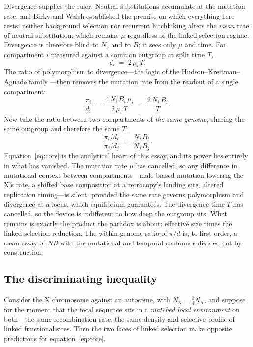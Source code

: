 \documentclass[11pt,a4paper]{article}
\newcommand{\Ne}{N_{e}}
\newcommand{\NA}{N_{\mathrm{A}}}
\newcommand{\NX}{N_{\mathrm{X}}}
\begin{document}
Divergence supplies the ruler. Neutral substitutions accumulate at the mutation rate, and Birky and Walsh \citep{birkywalsh1988} established the premise on which everything here rests: neither background selection nor recurrent hitchhiking alters the \emph{mean} rate of neutral substitution, which remains $\mu$ regardless of the linked-selection regime. Divergence is therefore blind to $\Ne$ and to $B$; it sees only $\mu$ and time. For compartment $i$ measured against a common outgroup at split time $T$,
\begin{equation}
    d_i \;=\; 2\,\mu_i\,T.
    \label{eq:d}
\end{equation}
The ratio of polymorphism to divergence---the logic of the Hudson--Kreitman--Aguad\'e family \citep{hka1987}---then removes the mutation rate from the readout of a single compartment:
\begin{equation}
    \frac{\pi_i}{d_i} \;=\; \frac{4\,N_i\,B_i\,\mu_i}{2\,\mu_i\,T} \;=\; \frac{2\,N_i\,B_i}{T}.
    \label{eq:pioverd}
\end{equation}
Now take the ratio between two compartments of \emph{the same genome}, sharing the same outgroup and therefore the same $T$:
\begin{equation}
    \boxed{\;\frac{\pi_i / d_i}{\pi_j / d_j} \;=\; \frac{N_i\,B_i}{N_j\,B_j}.\;}
    \label{eq:core}
\end{equation}
Equation~\eqref{eq:core} is the analytical heart of this essay, and its power lies entirely in what has vanished. The mutation rate $\mu$ has cancelled, so any difference in mutational context between compartments---male-biased mutation lowering the X's rate, a shifted base composition at a retrocopy's landing site, altered replication timing---is silent, provided the same rate governs polymorphism and divergence at a locus, which equilibrium guarantees. The divergence time $T$ has cancelled, so the device is indifferent to how deep the outgroup sits. What remains is exactly the product the paradox is about: effective size times the linked-selection reduction. The within-genome ratio of $\pi/d$ is, to first order, a clean assay of $N B$ with the mutational and temporal confounds divided out by construction.

\subsection{The discriminating inequality}

Consider the X chromosome against an autosome, with $\NX = \tfrac{3}{4}\NA$, and suppose for the moment that the focal sequence sits in a \emph{matched local environment} on both---the same recombination rate, the same density and selective profile of linked functional sites. Then the two faces of linked selection make opposite predictions for equation~\eqref{eq:core}.
\end{document}
